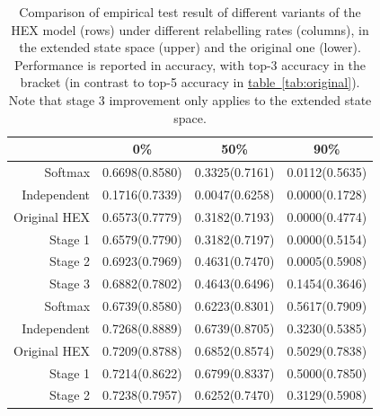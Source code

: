\documentclass[11pt,a4paper]{book}
\begin{document}
\begin{table}[htbp]
\centering
\begin{tabular}{r|c|c|c}
 & 0\% & 50\% & 90\%\\
\hline
Softmax      & 0.6698(0.8580) & 0.3325(0.7161) & 0.0112(0.5635)\\
Independent  & 0.1716(0.7339) & 0.0047(0.6258) & 0.0000(0.1728)\\
Original HEX & 0.6573(0.7779) & 0.3182(0.7193) & 0.0000(0.4774)\\
Stage 1      & 0.6579(0.7790) & 0.3182(0.7197) & 0.0000(0.5154)\\
Stage 2      & 0.6923(0.7969) & 0.4631(0.7470) & 0.0005(0.5908)\\
Stage 3      & 0.6882(0.7802) & 0.4643(0.6496) & 0.1454(0.3646)\\
\hline
Softmax      & 0.6739(0.8580) & 0.6223(0.8301) & 0.5617(0.7909)\\
Independent  & 0.7268(0.8889) & 0.6739(0.8705) & 0.3230(0.5385)\\
Original HEX & 0.7209(0.8788) & 0.6852(0.8574) & 0.5029(0.7838)\\
Stage 1      & 0.7214(0.8622) & 0.6799(0.8337) & 0.5000(0.7850)\\
Stage 2      & 0.7238(0.7957) & 0.6252(0.7470) & 0.3129(0.5908)
\end{tabular}
\caption{Comparison of empirical test result of different variants of the 	HEX model (rows) under different relabelling rates (columns), in the extended state space (upper) and the original one (lower). Performance is reported in accuracy, with top-3 accuracy in the bracket (in contrast to top-5 accuracy in \hyperref[tab:original]{table~\ref{tab:original}}). Note that stage 3 improvement only applies to the extended state space.}
\label{tab:cnnacc}
\end{table}
\end{document}
